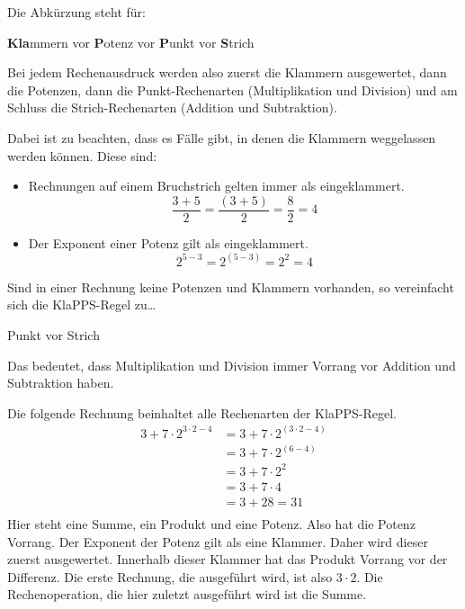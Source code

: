 \begin{regel}[KlaPPS]
 Die Abkürzung steht für:
 \begin{whitebox}
  \textbf{Kla}mmern vor \textbf{P}otenz vor \textbf{P}unkt vor \textbf{S}trich
 \end{whitebox}
 Bei jedem Rechenausdruck werden also zuerst die Klammern ausgewertet, dann die Potenzen, dann die Punkt-Rechenarten (Multiplikation und Division) und am Schluss die Strich-Rechenarten (Addition und Subtraktion).
 
 Dabei ist zu beachten, dass es Fälle gibt, in denen die Klammern weggelassen werden können. Diese sind:
 \begin{itemize}
  \item Rechnungen auf einem Bruchstrich gelten immer als eingeklammert.
  \[\frac{3+5}{2} = \frac{(3+5)}{2} = \frac{8}{2} = 4\]
  \item Der Exponent einer Potenz gilt als eingeklammert.
  \[2^{5-3} = 2^{(5-3)} = 2^2 = 4\]
 \end{itemize}
\end{regel}
 
 \begin{regel}
 Sind in einer Rechnung keine Potenzen und Klammern vorhanden, so vereinfacht sich die KlaPPS-Regel zu\ldots
 \begin{whitebox}
 \begin{center}
  Punkt vor Strich
  \end{center}
 \end{whitebox}
 Das bedeutet, dass Multiplikation und Division immer Vorrang vor Addition und Subtraktion haben.

\end{regel}

\begin{bsp}
 Die folgende Rechnung beinhaltet alle Rechenarten der KlaPPS-Regel.
 \begin{align*}
  3+7\cdot 2^{3\cdot 2 - 4} &= 3+7\cdot 2^{(3\cdot 2 -4)}\\
                            &= 3+7\cdot 2^{(6-4)}\\
                            &= 3+7\cdot 2^{2} \\
                            &= 3+7\cdot 4 \\
                            &= 3+28 = 31\\
 \end{align*}
 Hier steht eine Summe, ein Produkt und eine Potenz. Also hat die Potenz Vorrang. Der Exponent der Potenz gilt als eine Klammer. Daher wird dieser zuerst ausgewertet. Innerhalb dieser Klammer hat das Produkt Vorrang vor der Differenz. Die erste Rechnung, die ausgeführt wird, ist also \(3\cdot 2\). Die Rechenoperation, die hier zuletzt ausgeführt wird ist die Summe. 
\end{bsp}

